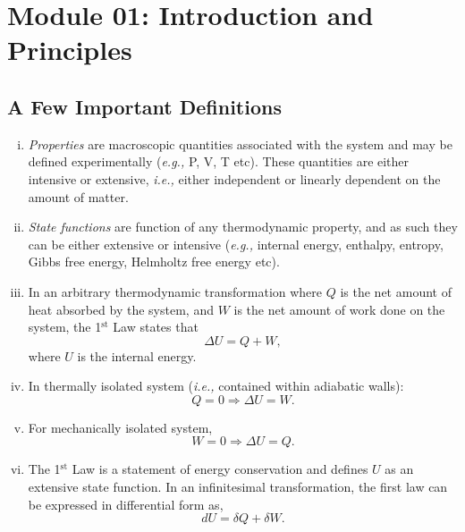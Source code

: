 \documentclass[12pts,a4paper,amsmath,amssymb,floatfix]{article}%
\newcommand{\eg}{{\it e.g., }}
\newcommand{\ie}{{\it i.e., }}
\begin{document}
\section{Module 01: Introduction and Principles}

\subsection{A Few Important Definitions}
  
   \begin{enumerate}[i)]
%
      \item {\it Properties} are macroscopic quantities associated with the system and may be defined experimentally (\eg P, V, T etc). These quantities are either intensive or extensive, \ie either independent or linearly dependent on the amount of matter.
%
      \item {\it State functions} are function of any thermodynamic property, and as such they can be either extensive or intensive (\eg internal energy, enthalpy, entropy, Gibbs free energy, Helmholtz free energy etc).
%
      \item In an arbitrary thermodynamic transformation where $Q$ is the net amount of heat absorbed by the system, and $W$ is the net amount of work done on the system, the 1$^{\text{st}}$ Law states that
          \begin{displaymath}
             \Delta U = Q + W,
          \end{displaymath}
where $U$ is the internal energy.
%
      \item In thermally isolated system (\ie contained within adiabatic walls):
          \begin{displaymath}
             Q = 0 \Longrightarrow \Delta U = W. 
          \end{displaymath}
%
      \item For mechanically isolated system,
          \begin{displaymath}
             W = 0 \Longrightarrow \Delta U = Q.
          \end{displaymath}
%
      \item The 1$^{\text{st}}$ Law is a statement of energy conservation and defines $U$ as an extensive state function. In an infinitesimal transformation, the first law can be expressed in differential form as,
          \begin{displaymath}
             dU = \delta Q + \delta W.
          \end{displaymath}

\end{enumerate}
\end{document}
